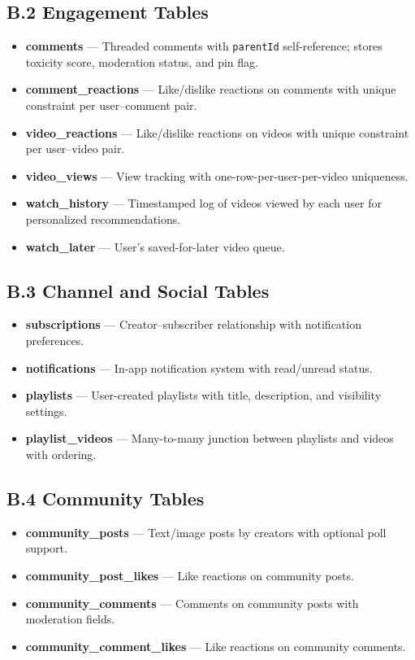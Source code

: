 \subsection*{B.2 Engagement Tables}
\begin{itemize}[noitemsep]
  \item \textbf{comments} --- Threaded comments with \texttt{parentId} self-reference; stores toxicity score, moderation status, and pin flag.
  \item \textbf{comment\_reactions} --- Like/dislike reactions on comments with unique constraint per user--comment pair.
  \item \textbf{video\_reactions} --- Like/dislike reactions on videos with unique constraint per user--video pair.
  \item \textbf{video\_views} --- View tracking with one-row-per-user-per-video uniqueness.
  \item \textbf{watch\_history} --- Timestamped log of videos viewed by each user for personalized recommendations.
  \item \textbf{watch\_later} --- User's saved-for-later video queue.
\end{itemize}

\subsection*{B.3 Channel and Social Tables}
\begin{itemize}[noitemsep]
  \item \textbf{subscriptions} --- Creator--subscriber relationship with notification preferences.
  \item \textbf{notifications} --- In-app notification system with read/unread status.
  \item \textbf{playlists} --- User-created playlists with title, description, and visibility settings.
  \item \textbf{playlist\_videos} --- Many-to-many junction between playlists and videos with ordering.
\end{itemize}

\subsection*{B.4 Community Tables}
\begin{itemize}[noitemsep]
  \item \textbf{community\_posts} --- Text/image posts by creators with optional poll support.
  \item \textbf{community\_post\_likes} --- Like reactions on community posts.
  \item \textbf{community\_comments} --- Comments on community posts with moderation fields.
  \item \textbf{community\_comment\_likes} --- Like reactions on community comments.
\end{itemize}

